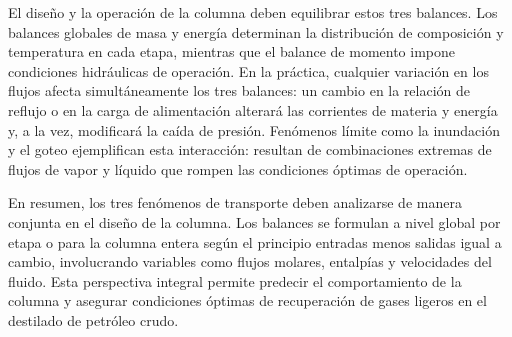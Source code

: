 El diseño y la operación de la columna deben equilibrar estos tres balances. Los balances globales de masa y energía determinan la distribución de composición y temperatura en cada etapa, mientras que el balance de momento impone condiciones hidráulicas de operación. En la práctica, cualquier variación en los flujos afecta simultáneamente los tres balances: un cambio en la relación de reflujo o en la carga de alimentación alterará las corrientes de materia y energía y, a la vez, modificará la caída de presión. Fenómenos límite como la inundación y el goteo ejemplifican esta interacción: resultan de combinaciones extremas de flujos de vapor y líquido que rompen las condiciones óptimas de operación.

En resumen, los tres fenómenos de transporte deben analizarse de manera conjunta en el diseño de la columna. Los balances se formulan a nivel global por etapa o para la columna entera según el principio entradas menos salidas igual a cambio, involucrando variables como flujos molares, entalpías y velocidades del fluido. Esta perspectiva integral permite predecir el comportamiento de la columna y asegurar condiciones óptimas de recuperación de gases ligeros en el destilado de petróleo crudo.
